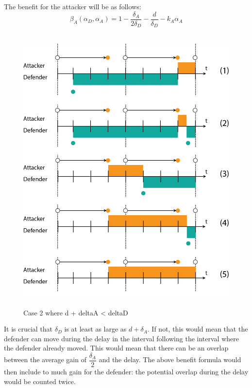 \documentclass[journal,a4paper]{IEEEtran}
\begin{document}
The benefit for the attacker will be as follows:
\begin{equation}\label{first}
\beta_{A}(\alpha_{D},\alpha_{A}) = 1 -\dfrac{\delta_{A}}{2\delta_{D}} - \dfrac{d}{\delta_{D}} - k_{A} \alpha_{A} 
\end{equation}\\

\begin{figure}[hbtp]
\caption{Case 2 where d + deltaA < deltaD}
\centering
\includegraphics[scale=0.5]{../../doc/template/Images/FlipItCase2.png}
\label{fig:case2}
\end{figure}


It is crucial that $ \delta_{D}$ is at least as large as $d + \delta_{A}$. If not, this would mean that the defender can move during the delay in the interval following the interval where the defender already moved. This would mean that there can be an overlap between the average gain of $\dfrac{\delta_{A}}{2}$ and the delay. The above benefit formula would then include to much gain for the defender: the potential overlap during the delay would be counted twice. \\
\end{document}
